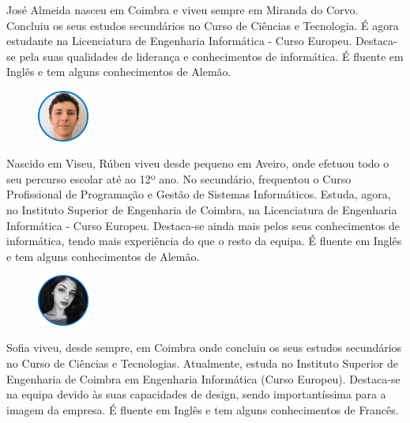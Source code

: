 \documentclass[11pt]{article}
\begin{document}
	\vspace{0.3cm}
	
	José Almeida nasceu em Coimbra e viveu sempre em Miranda do Corvo. Concluiu os seus estudos secundários no Curso de Ciências e Tecnologia. É agora estudante na Licenciatura de Engenharia Informática - Curso Europeu. Destaca-se pela suas qualidades de liderança e conhecimentos de informática. É fluente em Inglês e tem alguns conhecimentos de Alemão.
	
	\vspace{1cm}
	
	\begin{figure}[h]
		\includegraphics[width=0.15\textwidth,keepaspectratio]{rlousada}
		\label{fig:rl}
		\centering
	\end{figure}
	
	\vspace{0.3cm}
	
	Nascido em Viseu, Rúben viveu desde pequeno em Aveiro, onde efetuou todo o seu percurso escolar até ao 12º ano. No secundário, frequentou o Curso Profissional de Programação e Gestão de Sistemas Informáticos. Estuda, agora, no Instituto Superior de Engenharia de Coimbra, na Licenciatura de Engenharia Informática - Curso Europeu. Destaca-se ainda mais pelos seus conhecimentos de informática, tendo mais experiência do que o resto da equipa. É fluente em Inglês e tem alguns conhecimentos de Alemão.
	
	\vspace{1cm}
	
	\begin{figure}[h]
		\includegraphics[width=0.15\textwidth,keepaspectratio]{sjaneiro}
		\label{fig:sj}
		\centering
	\end{figure}
	
	\pagebreak
	
	Sofia viveu, desde sempre, em Coimbra onde concluiu os seus estudos secundários no Curso de Ciências e Tecnologias. Atualmente, estuda no Instituto Superior de Engenharia de Coimbra em Engenharia Informática (Curso Europeu). Destaca-se na equipa devido às suas capacidades de design, sendo importantíssima para a imagem da empresa. É fluente em Inglês e tem alguns conhecimentos de Francês.
	
\end{document}
